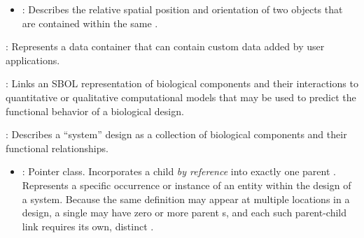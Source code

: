 \begin{description}
\begin{itemize}
\item \emph{}:
Describes the relative spatial position and orientation of two  objects that are contained within the same .
\end{itemize}

\item \emph{}:
Represents a data container that can contain custom data added by user applications.

\item \emph{}:
Links an SBOL representation of biological components and their interactions to quantitative or qualitative computational models that may be used to predict the functional behavior of a biological design.

\item \emph{}:
Describes a ``system'' design as a collection of biological components and their functional relationships.

\begin{itemize}
\item \emph{}:
Pointer class. Incorporates a child  \textit{by reference} into exactly one parent . Represents a specific occurrence or instance of an entity within the design of a system. Because the same definition may appear at multiple locations in a design, a single  may have zero or more parent s, and each such parent-child link requires its own, distinct .


\end{itemize}
\end{description}
